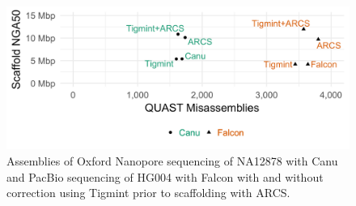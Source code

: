 \documentclass{bmcart}
\begin{document}
\begin{figure}[!htbp]
\hypertarget{fig:metrics-sms}{%
\centering
\includegraphics[width=4.8in]{figures/metrics-sms.png}
\caption{Assemblies of Oxford Nanopore sequencing of NA12878 with Canu and PacBio sequencing of HG004 with Falcon with and without correction using Tigmint prior to scaffolding with ARCS.}\label{fig:metrics-sms}
}
\end{figure}
\end{document}
